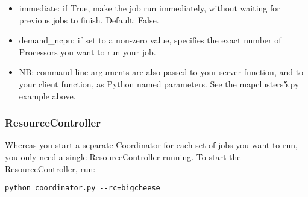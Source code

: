 \documentclass{howto}
\begin{document}
\begin{itemize}
\begin{itemize}
    \item
    immediate: if True, make the job run immediately, without waiting for previous jobs to finish.  Default: False.
    
    \item
    demand_ncpu: if set to a non-zero value, specifies the exact number of Processors you want to run your job.

    \item
    NB: command line arguments are also passed to your server function, and to your client function, as Python named parameters.  See the mapclusters5.py example above.
    \end{itemize}
\end{itemize}

\subsubsection{ResourceController}

Whereas you start a separate Coordinator for each set of jobs you want to run, you only need a single ResourceController running. To start the ResourceController, run:

\begin{verbatim}
python coordinator.py --rc=bigcheese
\end{verbatim}
\end{document}
